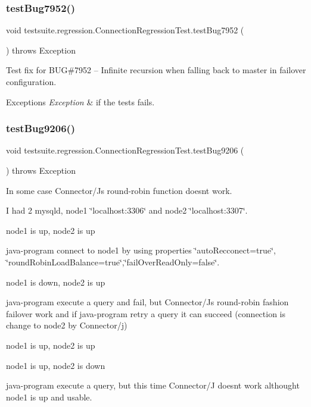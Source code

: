 \subsubsection{\texorpdfstring{test\+Bug7952()}{testBug7952()}}
{\footnotesize\ttfamily void testsuite.\+regression.\+Connection\+Regression\+Test.\+test\+Bug7952 (\begin{DoxyParamCaption}{ }\end{DoxyParamCaption}) throws Exception}

Test fix for B\+UG\#7952 -- Infinite recursion when \textquotesingle{}falling back\textquotesingle{} to master in failover configuration.


\begin{DoxyExceptions}{Exceptions}
{\em Exception} & if the tests fails. \\
\hline
\end{DoxyExceptions}
\mbox{\label{classtestsuite_1_1regression_1_1_connection_regression_test_a296d1449fdc8a1628b7029ab70e450e8}} 
\subsubsection{\texorpdfstring{test\+Bug9206()}{testBug9206()}}
{\footnotesize\ttfamily void testsuite.\+regression.\+Connection\+Regression\+Test.\+test\+Bug9206 (\begin{DoxyParamCaption}{ }\end{DoxyParamCaption}) throws Exception}

In some case Connector/J\textquotesingle{}s round-\/robin function doesn\textquotesingle{}t work.

I had 2 mysqld, node1 \char`\"{}localhost\+:3306\char`\"{} and node2 \char`\"{}localhost\+:3307\char`\"{}.


\begin{DoxyEnumerate}
\item node1 is up, node2 is up
\item java-\/program connect to node1 by using properties \char`\"{}auto\+Recconect=true\char`\"{}, \char`\"{}round\+Robin\+Load\+Balance=true\char`\"{},\char`\"{}fail\+Over\+Read\+Only=false\char`\"{}.
\item node1 is down, node2 is up
\item java-\/program execute a query and fail, but Connector/J\textquotesingle{}s round-\/robin fashion failover work and if java-\/program retry a query it can succeed (connection is change to node2 by Connector/j)
\item node1 is up, node2 is up
\item node1 is up, node2 is down
\item java-\/program execute a query, but this time Connector/J doesn\textquotesingle{}t work althought node1 is up and usable.
\end{DoxyEnumerate}


